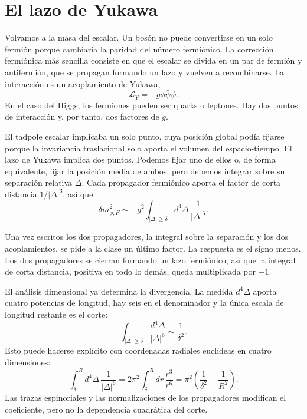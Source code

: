 \section{El lazo de Yukawa}

Volvamos a la masa del escalar. Un bosón no puede convertirse en un solo fermión porque cambiaría la paridad del número fermiónico. La corrección fermiónica más sencilla consiste en que el escalar se divida en un par de fermión y antifermión, que se propagan formando un lazo y vuelven a recombinarse. La interacción es un acoplamiento de Yukawa,
\begin{equation}
\mathcal L_Y=-g\phi\bar\psi\psi.
\end{equation}
En el caso del Higgs, los fermiones pueden ser quarks o leptones. Hay dos puntos de interacción y, por tanto, dos factores de \(g\).

El tadpole escalar implicaba un solo punto, cuya posición global podía fijarse porque la invariancia traslacional solo aporta el volumen del espacio-tiempo. El lazo de Yukawa implica dos puntos. Podemos fijar uno de ellos o, de forma equivalente, fijar la posición media de ambos, pero debemos integrar sobre su separación relativa \(\Delta\). Cada propagador fermiónico aporta el factor de corta distancia \(1/|\Delta|^3\), así que
\begin{equation}
\delta m_{\phi,F}^2
\sim
-g^2\int_{|\Delta|\geq\delta}d^4\Delta\,
\frac{1}{|\Delta|^6}.
\end{equation}

Una vez escritos los dos propagadores, la integral sobre la separación y los dos acoplamientos, se pide a la clase un último factor. La respuesta es el signo menos. Los dos propagadores se cierran formando un lazo fermiónico, así que la integral de corta distancia, positiva en todo lo demás, queda multiplicada por \(-1\).

El análisis dimensional ya determina la divergencia. La medida \(d^4\Delta\) aporta cuatro potencias de longitud, hay seis en el denominador y la única escala de longitud restante es el corte:
\begin{equation}
\int_{|\Delta|\geq\delta}
\frac{d^4\Delta}{|\Delta|^6}
\sim\frac{1}{\delta^2}.
\end{equation}
Esto puede hacerse explícito con coordenadas radiales euclídeas en cuatro dimensiones:
\begin{equation}
\int_{\delta}^{R}d^4\Delta\,\frac{1}{|\Delta|^6}
=2\pi^2\int_{\delta}^{R}dr\,\frac{r^3}{r^6}
=\pi^2\left(\frac{1}{\delta^2}-\frac{1}{R^2}\right).
\end{equation}
Las trazas espinoriales y las normalizaciones de los propagadores modifican el coeficiente, pero no la dependencia cuadrática del corte.

